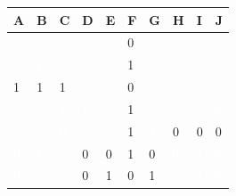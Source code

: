 \begin{table}[!htb]
\begin{tabular}{|l|l|l|l|l|l|l|l|l|l|}
\hline
\cellcolor{grauinfo}A&\cellcolor{grauinfo}B&\cellcolor{grauinfo}C&\cellcolor{grauinfo}D&\cellcolor{grauinfo}E &\cellcolor{grauinfo}F&\cellcolor{grauinfo}G&\cellcolor{grauinfo}H&\cellcolor{grauinfo}I&\cellcolor{grauinfo}J\\ \hline
\cellcolor{red1}\textcolor{white}{0} & \cellcolor{red1}\textcolor{white}{0} & \cellcolor{red1}\textcolor{white}{0} & \cellcolor{red2}\textcolor{white}{0} & \cellcolor{red2}\textcolor{white}{0} & 0 & \cellcolor{red2}\textcolor{white}{0} & \cellcolor{red3}\textcolor{white}{0} & \cellcolor{red3}\textcolor{white}{0} & \cellcolor{red3}\textcolor{white}{0} \\ \hline
\cellcolor{red1}\textcolor{white}{1} & \cellcolor{red1}\textcolor{white}{1} & \cellcolor{red1}\textcolor{white}{1} & \cellcolor{red2}\textcolor{white}{1} & \cellcolor{red2}\textcolor{white}{1} & 1 & \cellcolor{red2}\textcolor{white}{1} & \cellcolor{red3}\textcolor{white}{1} & \cellcolor{red3}\textcolor{white}{1} & \cellcolor{red3}\textcolor{white}{1} \\ \hline
1 & 1 & 1 & \cellcolor{red2}\textcolor{white}{0} & \cellcolor{red2}\textcolor{white}{1} & 0 & \cellcolor{red2}\textcolor{white}{0} & \cellcolor{red3}\textcolor{white}{0} & \cellcolor{red3}\textcolor{white}{0} & \cellcolor{red3}\textcolor{white}{1} \\ \hline
\cellcolor{red1}\textcolor{white}{1} & \cellcolor{red1}\textcolor{white}{0} & \cellcolor{red1}\textcolor{white}{1} & \cellcolor{red2}\textcolor{white}{1} & \cellcolor{red2}\textcolor{white}{0} & 1 & \cellcolor{red2}\textcolor{white}{0} & \cellcolor{red3}\textcolor{white}{1} & \cellcolor{red3}\textcolor{white}{0} & \cellcolor{red3}\textcolor{white}{0} \\ \hline
\cellcolor{red1}\textcolor{white}{1} & \cellcolor{red1}\textcolor{white}{0} & \cellcolor{red1}\textcolor{white}{0} & \cellcolor{red2}\textcolor{white}{0} & \cellcolor{red2}\textcolor{white}{1} & 1 & \cellcolor{red2}\textcolor{white}{1} & 0 & 0 & 0 \\ \hline
\cellcolor{red1}\textcolor{white}{0} & \cellcolor{red1}\textcolor{white}{1} & \cellcolor{red1}\textcolor{white}{1} & 0 & 0 & 1 & 0 & \cellcolor{red3}\textcolor{white}{0} & \cellcolor{red3}\textcolor{white}{1} & \cellcolor{red3}\textcolor{white}{0} \\ \hline
\cellcolor{red1}\textcolor{white}{0} & \cellcolor{red1}\textcolor{white}{0} & \cellcolor{red1}\textcolor{white}{1} & 0 & 1 & 0 & 1 & \cellcolor{red3}\textcolor{white}{1} & \cellcolor{red3}\textcolor{white}{1} & \cellcolor{red3}\textcolor{white}{0} \\ \hline

\end{tabular}
\end{table}
